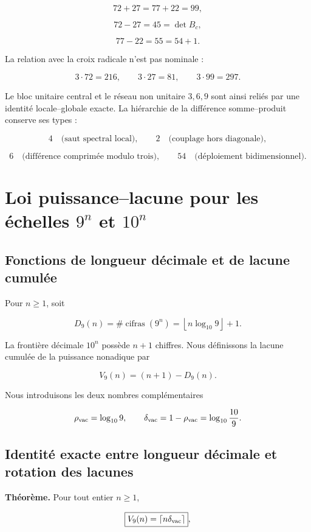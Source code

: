 \[
72+27=77+22=99,
\]

\[
72-27=45=\det B_c,
\]

\[
77-22=55=54+1.
\]

La relation avec la croix radicale n’est pas nominale :

\[
3\cdot72=216,
\qquad
3\cdot27=81,
\qquad
3\cdot99=297.
\]

Le bloc unitaire central et le réseau non unitaire \(3,6,9\) sont ainsi reliés par une identité locale–globale exacte. La hiérarchie de la différence somme–produit conserve ses types :

\[
4\quad\text{(saut spectral local)},\qquad
2\quad\text{(couplage hors diagonale)},
\]

\[
6\quad\text{(différence comprimée modulo trois)},\qquad
54\quad\text{(déploiement bidimensionnel)}.
\]


\section{Loi puissance--lacune pour les échelles \texorpdfstring{\(9^n\)}{9 à la puissance n} et \texorpdfstring{\(10^n\)}{10 à la puissance n}}

\subsection{Fonctions de longueur décimale et de lacune cumulée}

Pour \(n\ge1\), soit

\[
D_9(n)=\#\operatorname{cifras}(9^n)
=\left\lfloor n\log_{10}9\right\rfloor+1.
\]

La frontière décimale \(10^n\) possède \(n+1\) chiffres. Nous définissons la lacune cumulée de la puissance nonadique par

\[
V_9(n)=(n+1)-D_9(n).
\]

Nous introduisons les deux nombres complémentaires

\[
\rho_{\rm vac}=\log_{10}9,
\qquad
\delta_{\rm vac}=1-\rho_{\rm vac}
=\log_{10}\frac{10}{9}.
\]

\subsection{Identité exacte entre longueur décimale et rotation des lacunes}

\textbf{Théorème.} Pour tout entier \(n\ge1\),

\[
\boxed{V_9(n)=\left\lceil n\delta_{\rm vac}\right\rceil},
\]

